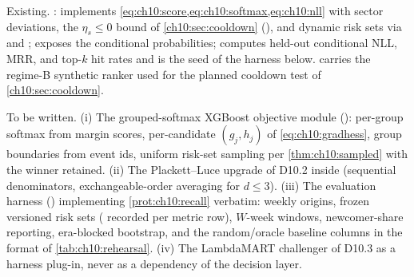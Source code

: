 \begin{codehooks}
Existing. : 
implements \cref{eq:ch10:score,eq:ch10:softmax,eq:ch10:nll} with sector
deviations, the $\eta_s \le 0$ bound of \cref{ch10:sec:cooldown}
(), and dynamic risk sets via
 and ;
 exposes the conditional probabilities;
 computes held-out conditional NLL, MRR, and
top-$k$ hit rates and is the seed of the harness below.
 carries the regime-B synthetic ranker
used for the planned cooldown test of \cref{ch10:sec:cooldown}.

To be written. (i) The grouped-softmax XGBoost objective module
(): per-group softmax
from margin scores, per-candidate $(g_j, h_j)$ of
\cref{eq:ch10:gradhess}, group boundaries from event ids, uniform
risk-set sampling per \cref{thm:ch10:sampled} with the winner retained.
(ii) The Plackett--Luce upgrade of D10.2 inside
 (sequential denominators, exchangeable-order
averaging for $d \le 3$). (iii) The evaluation harness
() implementing \cref{prot:ch10:recall}
verbatim: weekly origins, frozen versioned risk sets
( recorded per metric row), $W$-week windows,
newcomer-share reporting, era-blocked bootstrap, and the
random/oracle baseline columns in the format of
\cref{tab:ch10:rehearsal}. (iv) The
LambdaMART challenger of D10.3 as a harness plug-in, never as a
dependency of the decision layer.
\end{codehooks}

